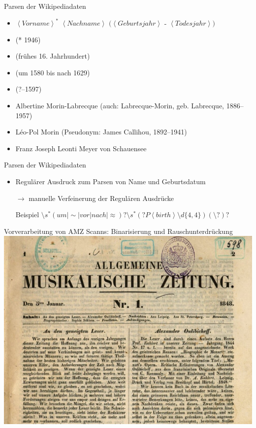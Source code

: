 \documentclass{beamer}
\begin{document}
\begin{frame}{Parsen der Wikipediadaten}
	\begin{itemize}
		\item $ \left\langle Vorname\right\rangle ^* $   $\left\langle Nachname\right\rangle$ $(\left\langle Geburtsjahr\right\rangle$ - $\left\langle Todesjahr\right\rangle )$
		\item (* 1946)
		\item (frühes 16. Jahrhundert)
		\item (um 1580 bis nach 1629)
		\item (?–1597)
		\item Albertine Morin-Labrecque (auch: Labrecque-Morin, geb. Labrecque, 1886–1957)
		\item Léo-Pol Morin (Pseudonym: James Callihou, 1892–1941)
		\item Franz Joseph Leonti Meyer von Schauensee 
	\end{itemize}
\end{frame}
\begin{frame}{Parsen der Wikipediadaten}
	\begin{itemize}
			\item Regulärer Ausdruck zum Parsen von Name und Geburtsdatum
			\item[$\rightarrow$ ] manuelle Verfeinerung der Regulären Ausdrücke
			\item[Beispiel   ] $ \setminus s^*(um|\sim |vor|nach| \approx )?\setminus s^*(?P\left\langle birth\right \rangle \setminus d\{4,4\})(\setminus?)? $
	\end{itemize}
\end{frame}
\begin{frame}{Vorverarbeitung von AMZ Scanns: Binarisierung und Rauschunterdrückung}
	\includegraphics[scale=.36]{"data/unbinarisiert.png"}
\end{frame}
\end{document}

